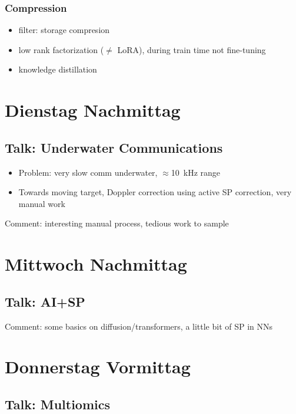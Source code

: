 \documentclass[a4paper]{article}
\begin{document}
\subsubsection{Compression}
\begin{itemize}
    \item filter: storage compresion
    \item low rank factorization ($\neq$ LoRA), during train time not fine-tuning
    \item knowledge distillation
\end{itemize}

\section{Dienstag Nachmittag}

\subsection{Talk: Underwater Communications}

\begin{itemize}
    \item Problem: very slow comm underwater, $\approx$10~kHz range
    \item Towards moving target, Doppler correction using active SP correction, very manual work
\end{itemize}
Comment: interesting manual process, tedious work to sample


\section{Mittwoch Nachmittag}

\subsection{Talk: AI+SP}
Comment: some basics on diffusion/transformers, a little bit of SP in NNs


\section{Donnerstag Vormittag}

\subsection{Talk: Multiomics}
\end{document}

